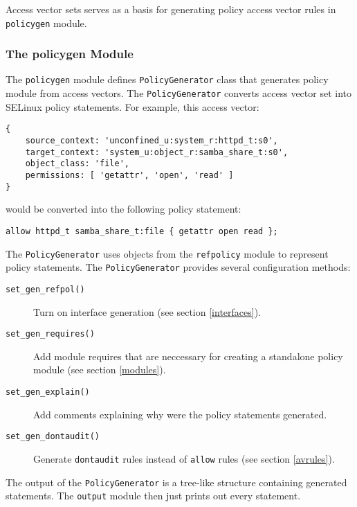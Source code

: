 Access vector sets serves as a basis for generating policy access vector rules
in \texttt{policygen} module.

\subsubsection{The policygen Module}

The \texttt{policygen} module defines \texttt{PolicyGenerator} class that
generates policy module from access vectors. The \texttt{PolicyGenerator}
converts access vector set into SELinux policy statements. For example, this
access vector:
\begin{lstlisting}
{
    source_context: 'unconfined_u:system_r:httpd_t:s0',
    target_context: 'system_u:object_r:samba_share_t:s0',
    object_class: 'file',
    permissions: [ 'getattr', 'open', 'read' ]
}
\end{lstlisting}
would be converted into the following policy statement:
\begin{lstlisting}
allow httpd_t samba_share_t:file { getattr open read };
\end{lstlisting}

The \texttt{PolicyGenerator} uses objects from the \texttt{refpolicy} module to
represent policy statements. The \texttt{PolicyGenerator} provides several
configuration methods:
\begin{description}
    \item [\texttt{set\_gen\_refpol()}] Turn on interface generation (see
        section \ref{interfaces}).
    \item [\texttt{set\_gen\_requires()}] Add module requires that are
        neccessary for creating a standalone policy module (see section
        \ref{modules}).
    \item [\texttt{set\_gen\_explain()}] Add comments explaining why were the
        policy statements generated.
    \item [\texttt{set\_gen\_dontaudit()}] Generate \texttt{dontaudit} rules
        instead of \texttt{allow} rules (see section \ref{avrules}).
\end{description}
The output of the \texttt{PolicyGenerator} is a tree-like structure containing
generated statements. The \texttt{output} module then just prints out every
statement.

